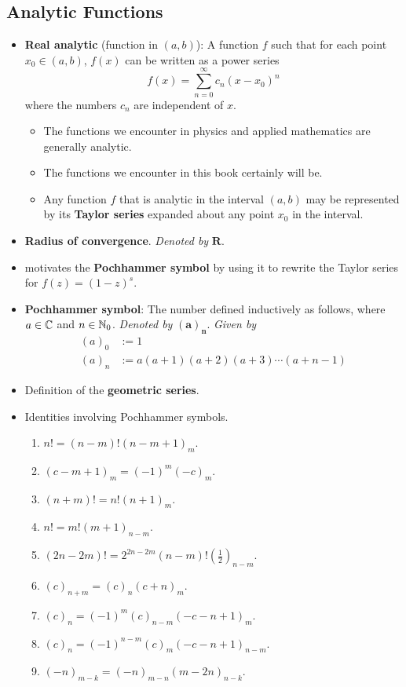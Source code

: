 \documentclass[../finalProject.tex]{subfiles}
\begin{document}
\subsection{Analytic Functions}
\begin{itemize}
    \item \textbf{Real analytic} (function in $(a,b)$): A function $f$ such that for each point $x_0\in(a,b)$, $f(x)$ can be written as a power series
    \begin{equation*}
        f(x) = \sum_{n=0}^\infty c_n(x-x_0)^n
    \end{equation*}
    where the numbers $c_n$ are independent of $x$.
    \begin{itemize}
        \item The functions we encounter in physics and applied mathematics are generally analytic.
        \item The functions we encounter in this book certainly will be.
        \item Any function $f$ that is analytic in the interval $(a,b)$ may be represented by its \textbf{Taylor series} expanded about any point $x_0$ in the interval.
    \end{itemize}
    \item \textbf{Radius of convergence}. \emph{Denoted by} $\bm{R}$.
    \item \textcite{bib:Seaborn} motivates the \textbf{Pochhammer symbol} by using it to rewrite the Taylor series for $f(z)=(1-z)^s$.
    \item \textbf{Pochhammer symbol}: The number defined inductively as follows, where $a\in\mathbb{C}$ and $n\in\mathbb{N}_0$. \emph{Denoted by} $\bm{(a)_n}$. \emph{Given by}
    \begin{align*}
        (a)_0 &:= 1\\
        (a)_n &:= a(a+1)(a+2)(a+3)\cdots(a+n-1)\tag{$n=1,2,3,\dots$}
    \end{align*}
    \item Definition of the \textbf{geometric series}.
    \item Identities involving Pochhammer symbols.
    \begin{enumerate}
        \item $n!=(n-m)!(n-m+1)_m$.
        \item $(c-m+1)_m=(-1)^m(-c)_m$.
        \item $(n+m)!=n!(n+1)_m$.
        \item $n!=m!(m+1)_{n-m}$.
        \item $(2n-2m)!=2^{2n-2m}(n-m)!(\frac{1}{2})_{n-m}$.
        \item $(c)_{n+m}=(c)_n(c+n)_m$.
        \item $(c)_n=(-1)^m(c)_{n-m}(-c-n+1)_m$.
        \item $(c)_n=(-1)^{n-m}(c)_m(-c-n+1)_{n-m}$.
        \item $(-n)_{m-k}=(-n)_{m-n}(m-2n)_{n-k}$.
    \end{enumerate}
\end{itemize}
\end{document}
